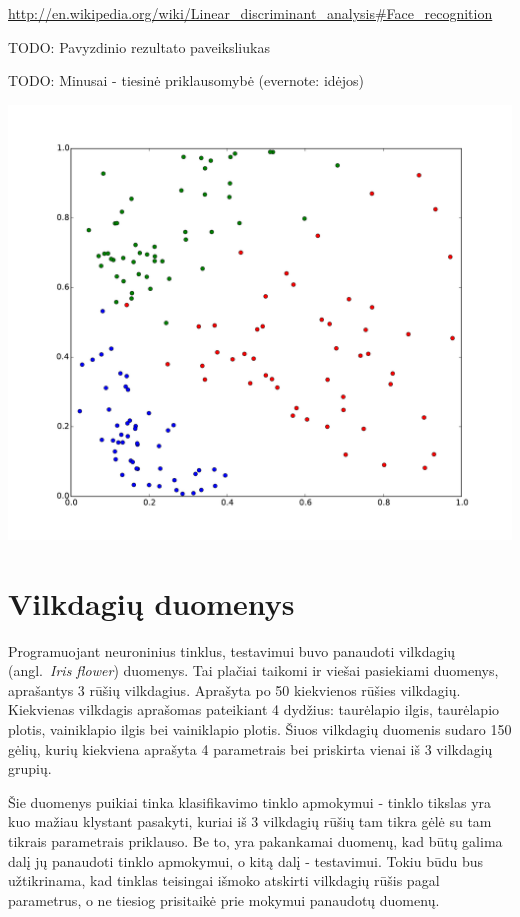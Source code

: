 \documentclass{VUMIFPSbakalaurinis}
\newcommand{\TODO}[1]{
\colorbox{todo-background-color}{TODO: #1}
}
\begin{document}
\url{http://en.wikipedia.org/wiki/Linear_discriminant_analysis#Face_recognition}

\TODO{Pavyzdinio rezultato paveiksliukas}

\TODO{Minusai - tiesinė priklausomybė (evernote: idėjos)}


\includegraphics[width=\linewidth]{pics/classification}


\section{Vilkdagių duomenys}

Programuojant neuroninius tinklus, testavimui buvo panaudoti vilkdagių (angl.~\textit{Iris flower}) duomenys.
Tai plačiai taikomi ir viešai pasiekiami duomenys, aprašantys 3 rūšių vilkdagius.
Aprašyta po 50 kiekvienos rūšies vilkdagių.
Kiekvienas vilkdagis aprašomas pateikiant 4 dydžius: taurėlapio ilgis, taurėlapio plotis, vainiklapio ilgis bei vainiklapio plotis.
Šiuos vilkdagių duomenis sudaro 150 gėlių, kurių kiekviena aprašyta 4 parametrais bei priskirta vienai iš 3 vilkdagių grupių.

Šie duomenys puikiai tinka klasifikavimo tinklo apmokymui - tinklo tikslas yra kuo mažiau klystant pasakyti, kuriai iš 3 vilkdagių rūšių tam tikra gėlė su tam tikrais parametrais priklauso.
Be to, yra pakankamai duomenų, kad būtų galima dalį jų panaudoti tinklo apmokymui, o kitą dalį - testavimui.
Tokiu būdu bus užtikrinama, kad tinklas teisingai išmoko atskirti vilkdagių rūšis pagal parametrus, o ne tiesiog prisitaikė prie mokymui panaudotų duomenų.
\end{document}
